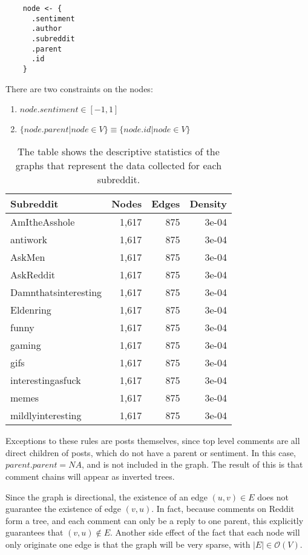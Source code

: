 \documentclass[
]{article}
\providecommand{\tightlist}{%
  \setlength{\itemsep}{0pt}\setlength{\parskip}{0pt}}
\begin{document}
\begin{verbatim}
    node <- {
      .sentiment
      .author
      .subreddit
      .parent
      .id
    }
\end{verbatim}

There are two constraints on the nodes:

\begin{enumerate}
\def\labelenumi{\arabic{enumi}.}
\tightlist
\item
  \(node.sentiment\in[-1,1]\)
\item
  \(\{node.parent|node\in V\}\equiv \{node.id|node\in V\}\)
\end{enumerate}

\begin{table}

\caption{\label{tab:graphstats}The table shows the descriptive statistics of the graphs that represent the data collected for each subreddit.}
\centering
\begin{tabular}[t]{lrrr}
\toprule
Subreddit & Nodes & Edges & Density\\
\midrule
AmItheAsshole & 1,617 & 875 & 3e-04\\
antiwork & 1,617 & 875 & 3e-04\\
AskMen & 1,617 & 875 & 3e-04\\
AskReddit & 1,617 & 875 & 3e-04\\
Damnthatsinteresting & 1,617 & 875 & 3e-04\\
\addlinespace
Eldenring & 1,617 & 875 & 3e-04\\
funny & 1,617 & 875 & 3e-04\\
gaming & 1,617 & 875 & 3e-04\\
gifs & 1,617 & 875 & 3e-04\\
interestingasfuck & 1,617 & 875 & 3e-04\\
\addlinespace
memes & 1,617 & 875 & 3e-04\\
mildlyinteresting & 1,617 & 875 & 3e-04\\
\bottomrule
\end{tabular}
\end{table}

Exceptions to these rules are posts themselves, since top level comments are all direct children of posts, which do not have a parent or sentiment. In this case, \(parent.parent=NA\), and is not included in the graph. The result of this is that comment chains will appear as inverted trees.

Since the graph is directional, the existence of an edge \((u,v)\in E\) does not guarantee the existence of edge \((v,u)\). In fact, because comments on Reddit form a tree, and each comment can only be a reply to one parent, this explicitly guarantees that \((v,u)\not\in E\). Another side effect of the fact that each node will only originate one edge is that the graph will be very sparse, with \(|E|\in\mathcal{O}(V)\).
\end{document}
